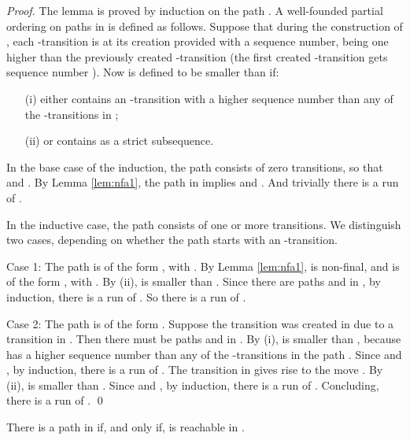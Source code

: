 \documentclass{llncs}
\begin{document}
\begin{proof}
The lemma is proved by induction on the path . A well-founded partial ordering on paths in  is defined as follows.
Suppose that during the construction of , each -transition is at its creation provided with a sequence number, being one
higher than the previously created -transition (the first created -transition gets sequence number ).
Now  is defined to be smaller than  if:

\vspace*{-2mm}
\begin{itemize}
\item[(i)]
either  contains an -transition with a higher sequence number than any of the
-transitions in ;
\item[(ii)]
or  contains  as a strict subsequence.
\end{itemize}

\vspace*{-2mm}

\noindent
In the base case of the induction, the path  consists of zero transitions, so that  and .
By Lemma \ref{lem:nfa1}, the path  in  implies  and . And trivially there is a run
 of .

In the inductive case, the path  consists of one or more transitions.
We distinguish two cases, depending on whether the path  starts with an -transition.

\vspace{1mm}

\noindent
{\sc Case 1}: The path  is of the form , with .
By Lemma \ref{lem:nfa1},  is non-final, and  is of the form ,
with .
By (ii),  is smaller than .
Since there are paths  and  in ,
by induction, there is a run  of .
So there is a run  of .

\vspace{1mm}

\noindent
{\sc Case 2}: The path  is of the form .
Suppose the transition  was created in  due to a transition  in .
Then there must be paths  and  in .
By (i),  is smaller than , because
 has a higher sequence number than any of the -transitions in the path .
Since  and ,
by induction, there is a run  of .
The transition  in  gives rise to the move .
By (ii),  is smaller than .
Since  and ,
by induction, there is a run  of .
Concluding, there is a run  of .
\qed
\end{proof}

\begin{proposition}
\label{prop:nfa1}
There is a path  in  if, and only if,  is reachable in .
\end{proposition}
\end{document}
